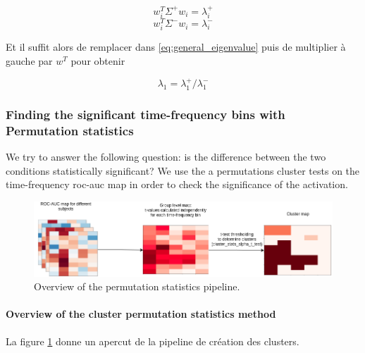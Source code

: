 \begin{equation}
    w^{T}_{i} \Sigma^{+} w_{i} = \lambda^{+}_{i}
    \label{eq:lambda_plus_first_component}
\end{equation}
\begin{equation}
    w^{T}_{i} \Sigma^{-} w_{i} = \lambda^{-}_{i}
    \label{eq:lambda_minus_first_component}
\end{equation}

Et il suffit alors de remplacer dans \ref{eq:general_eigenvalue} puis de multiplier à gauche par $w^{T}$ pour obtenir

\begin{equation}
    \lambda_1 = \lambda^{+}_1 / \lambda^{-}_1
\end{equation}


\subsubsection{Finding the significant time-frequency bins with Permutation statistics}

We try to answer the following question: is the difference between
the two conditions statistically significant? We use the a permutations
cluster tests on the time-frequency roc-auc map in order to check the significance of the activation.

\begin{figure}[ht]
    \centering
    \includegraphics[width=15cm]{images_report/sensor/Permutation_statistics.png}
    \caption[Overview of the permutation statistics pipeline.]%
    {Overview of the permutation statistics pipeline.}
    \label{permutation_statistics_pipeline}
\end{figure}


\paragraph{Overview of the cluster permutation statistics method}

La figure \ref{permutation_statistics_pipeline} donne un apercut de la pipeline de création des clusters.

